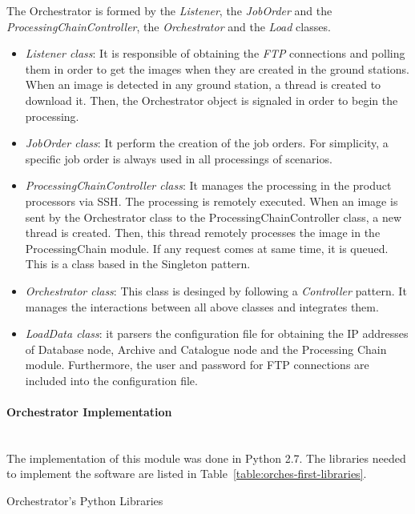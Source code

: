 The Orchestrator is formed by the \emph{Listener}, the \emph{JobOrder} and
the \emph{ProcessingChainController}, the \emph{Orchestrator} and the \emph{Load} classes.

\begin{itemize}
\item \emph{Listener class}: It is responsible of obtaining the \emph{FTP}
  connections and polling them in order to get the images when they are created in the
  ground stations. When an image is detected in any ground station, a thread is
  created to download it. Then, the Orchestrator object is signaled in order
  to begin the processing.
\item \emph{JobOrder class}: It perform the creation of the job orders. For
  simplicity, a specific job order is always used in all
  processings of scenarios.
\item \emph{ProcessingChainController class}: It  manages the processing in the
  product processors via \ac{SSH}. The processing is remotely executed. When an image is
  sent by the Orchestrator class to the ProcessingChainController class, a
  new thread is created. Then, this thread remotely processes the image in the
  ProcessingChain module. If any request comes at same time, it is queued.
  This is a class based in the Singleton pattern.
\item \emph{Orchestrator class}: This class is desinged by following a \emph{Controller}
  pattern. It manages the interactions between all above classes and integrates
  them.
\item \emph{LoadData class}: it parsers the configuration file for obtaining the
  \ac{IP} addresses of Database node, Archive and Catalogue node and the
  Processing Chain module. Furthermore, the user and password for \ac{FTP}
  connections are included into the configuration file. 
\end{itemize}



\paragraph{Orchestrator Implementation}~\\

The implementation of this module was done in Python 2.7. The libraries
needed to implement the software are listed in Table~\ref{table:orches-first-libraries}.

\begin{table}[hp]
  \centering
  {\small
  
  }
  \caption{Orchestrator’s Python Libraries}
  \label{table:orches-first-libraries}
\end{table}

